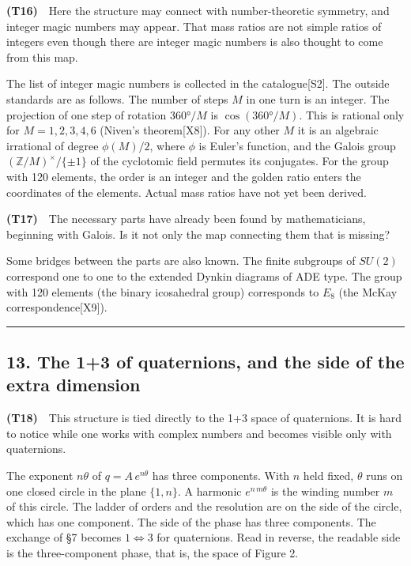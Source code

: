\documentclass[
  a4paper,
]{article}
\begin{document}
\textbf{(T16)}　Here the structure may connect with number-theoretic
symmetry, and integer magic numbers may appear. That mass ratios are not
simple ratios of integers even though there are integer magic numbers is
also thought to come from this map.

The list of integer magic numbers is collected in the catalogue{[}S2{]}.
The outside standards are as follows. The number of steps \(M\) in one
turn is an integer. The projection of one step of rotation \(360°/M\) is
\(\cos(360°/M)\). This is rational only for \(M=1,2,3,4,6\) (Niven's
theorem{[}X8{]}). For any other \(M\) it is an algebraic irrational of
degree \(\phi(M)/2\), where \(\phi\) is Euler's function, and the Galois
group \((\mathbb{Z}/M)^{\times}/\{\pm1\}\) of the cyclotomic field
permutes its conjugates. For the group with 120 elements, the order is
an integer and the golden ratio enters the coordinates of the elements.
Actual mass ratios have not yet been derived.

\textbf{(T17)}　The necessary parts have already been found by
mathematicians, beginning with Galois. Is it not only the map connecting
them that is missing?

Some bridges between the parts are also known. The finite subgroups of
\(SU(2)\) correspond one to one to the extended Dynkin diagrams of ADE
type. The group with 120 elements (the binary icosahedral group)
corresponds to \(E_8\) (the McKay correspondence{[}X9{]}).

\begin{center}\rule{0.5\linewidth}{0.5pt}\end{center}

\subsection{13. The 1+3 of quaternions, and the side of the extra
dimension}\label{the-13-of-quaternions-and-the-side-of-the-extra-dimension}

\textbf{(T18)}　This structure is tied directly to the 1+3 space of
quaternions. It is hard to notice while one works with complex numbers
and becomes visible only with quaternions.

The exponent \(n\theta\) of \(q=A\,e^{n\theta}\) has three components.
With \(n\) held fixed, \(\theta\) runs on one closed circle in the plane
\(\{1,n\}\). A harmonic \(e^{n\,m\theta}\) is the winding number \(m\)
of this circle. The ladder of orders and the resolution are on the side
of the circle, which has one component. The side of the phase has three
components. The exchange of §7 becomes \(1\Leftrightarrow3\) for
quaternions. Read in reverse, the readable side is the three-component
phase, that is, the space of Figure 2.
\end{document}
